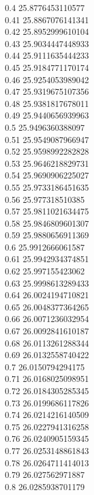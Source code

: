 {0.4	25.8776453110577\\
0.41	25.8867076141341\\
0.42	25.8952999610104\\
0.43	25.9034447448933\\
0.44	25.9111635444233\\
0.45	25.9184771170174\\
0.46	25.9254053989042\\
0.47	25.9319675107356\\
0.48	25.9381817678011\\
0.49	25.9440656939963\\
0.5	25.9496360388097\\
0.51	25.9549087966947\\
0.52	25.9598992282828\\
0.53	25.9646218829731\\
0.54	25.9690906225027\\
0.55	25.9733186451635\\
0.56	25.977318510385\\
0.57	25.9811021634475\\
0.58	25.9846809601307\\
0.59	25.9880656911369\\
0.6	25.9912666061587\\
0.61	25.9942934374851\\
0.62	25.997155423062\\
0.63	25.9998613289433\\
0.64	26.0024194710821\\
0.65	26.0048377364265\\
0.66	26.0071236032954\\
0.67	26.0092841610187\\
0.68	26.0113261288344\\
0.69	26.0132558740422\\
0.7	26.0150794294175\\
0.71	26.0168025098951\\
0.72	26.0184305285345\\
0.73	26.0199686117826\\
0.74	26.0214216140509\\
0.75	26.0227941316258\\
0.76	26.0240905159345\\
0.77	26.0253148861843\\
0.78	26.0264711414013\\
0.79	26.027562971887\\
0.8	26.0285938701179\\
}
